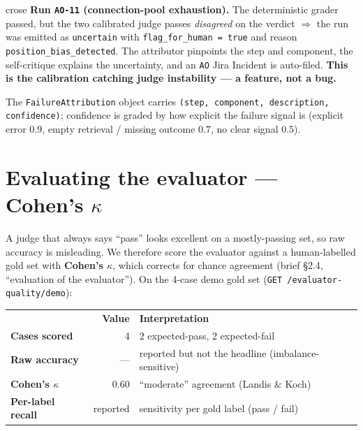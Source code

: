 \documentclass[11pt]{article}
\begin{document}
\begin{notebox}{crose}
\textbf{Run \texttt{AO-11} (connection-pool exhaustion).} The deterministic grader passed,
but the two calibrated judge passes \emph{disagreed} on the verdict $\Rightarrow$ the run was
emitted as \texttt{uncertain} with \texttt{flag\_for\_human = true} and reason
\texttt{position\_bias\_detected}. The attributor pinpoints the step and component, the
self-critique explains the uncertainty, and an \texttt{AO} Jira Incident is auto-filed.
\textbf{This is the calibration catching judge instability --- a feature, not a bug.}
\end{notebox}

The \texttt{FailureAttribution} object carries \texttt{(step, component, description,
confidence)}; confidence is graded by how explicit the failure signal is (explicit error
$0.9$, empty retrieval / missing outcome $0.7$, no clear signal $0.5$).

\section{Evaluating the evaluator --- Cohen's \texorpdfstring{$\kappa$}{kappa}}
A judge that always says ``pass'' looks excellent on a mostly-passing set, so raw accuracy is
misleading. We therefore score the evaluator against a human-labelled gold set with
\textbf{Cohen's $\kappa$}, which corrects for chance agreement (brief \S2.4, ``evaluation of
the evaluator''). On the 4-case demo gold set (\texttt{GET /evaluator-quality/demo}):

\begin{center}
\begin{tabular}{@{}>{\bfseries}p{4.6cm} r p{6.6cm}@{}}
\toprule
\rowcolor{headerbg}\multicolumn{1}{@{}>{\bfseries\color{white}}l}{Quantity} & \color{white}\bfseries Value & \color{white}\bfseries Interpretation \\
Cases scored & 4 & 2 expected-pass, 2 expected-fail \\
Raw accuracy & --- & reported but not the headline (imbalance-sensitive) \\
Cohen's $\kappa$ & 0.60 & ``moderate'' agreement (Landis \& Koch) \\
Per-label recall & reported & sensitivity per gold label (pass / fail) \\
\bottomrule
\end{tabular}
\end{center}
\end{document}
